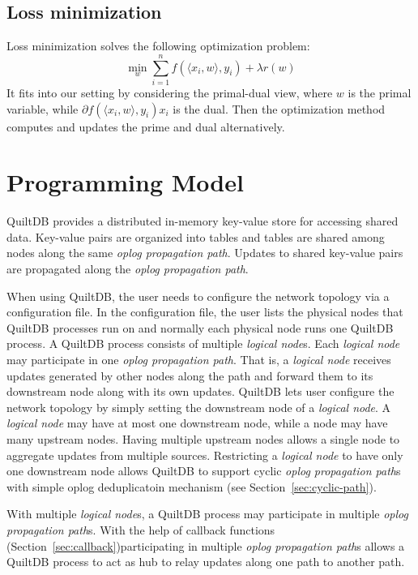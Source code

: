 \documentclass{acm_proc_article-sp}
\begin{document}
\subsection{Loss minimization}

Loss minimization solves the following optimization problem:
\begin{equation}
  \min_w \sum_{i=1}^{n} f(\langle x_i, w\rangle, y_i) + \lambda r(w)
\end{equation}
It fits into our setting by considering the primal-dual view, where $w$ is the primal
variable, while $\partial f(\langle x_i, w\rangle, y_i) x_i$ is the dual. Then
the optimization method computes and updates the prime and dual alternatively.

\section{Programming Model}

QuiltDB provides a distributed in-memory key-value store for accessing shared 
data. Key-value pairs are organized into tables and tables are shared among 
nodes along the same \emph{oplog propagation path}. Updates to shared key-value 
pairs are propagated along the \emph{oplog propagation path}.

When using QuiltDB, the user needs to configure the network topology via 
a configuration file. In the configuration file, the user lists the physical
nodes that QuiltDB processes run on and normally each physical node runs one 
QuiltDB process. A QuiltDB process consists of multiple \emph{logical node}s.
Each \emph{logical node} may participate in one \emph{oplog propagation path}. 
That is, a \emph{logical node} receives updates generated by other nodes along 
the path and forward them to its downstream node along with its own updates. 
QuiltDB lets user configure the network topology by simply setting the 
downstream node of a \emph{logical node}. A \emph{logical node} may have at most
 one downstream node, while a node may have many upstream nodes. Having multiple
 upstream nodes allows a single node to aggregate updates from multiple sources.
 Restricting a \emph{logical node} to have only one downstream node allows 
QuiltDB to support cyclic \emph{oplog propagation path}s with simple oplog 
deduplicatoin mechanism (see Section~\ref{sec:cyclic-path}).

With multiple \emph{logical node}s, a QuiltDB process may participate in 
multiple \emph{oplog propagation path}s. With the help of callback functions 
(Section~\ref{sec:callback})participating in multiple \emph{oplog propagation path}s
allows a QuiltDB process to act as hub to relay updates along one path to 
another path.
\end{document}
